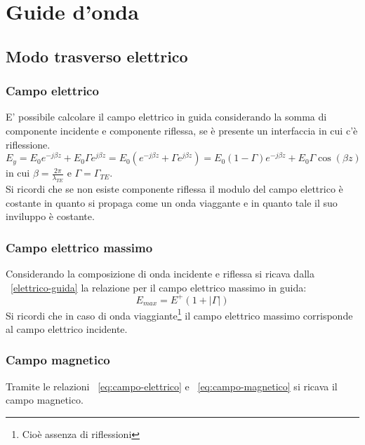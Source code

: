

\chapter{Guide d'onda}
		
	\section{Modo trasverso elettrico}

		\subsection{Campo elettrico}
		E' possibile calcolare il campo elettrico in guida considerando la somma di componente incidente e componente riflessa, se è presente un interfaccia in cui c'è riflessione.
				\begin{equation}
				E_y= E_0e^{-j\beta z}+E_0 \Gamma e^{j \beta z}=E_0(e^{-j \beta z}+\Gamma e^{j \beta z}) =E_0(1 - \Gamma)e^{-j \beta z} + E_0 \Gamma \cos(\beta z)
				\label{elettrico-guida}
				\end{equation}
				in cui $\beta=\frac{2 \pi }{\lambda_{TE}}$ e $\Gamma=\Gamma_{TE}$.
		\\

		Si ricordi che se non esiste componente riflessa il modulo del campo elettrico è costante in quanto si propaga come un onda viaggante e in quanto tale il suo inviluppo è costante.
	
		\subsection{Campo elettrico massimo}
		Considerando la composizione di onda incidente e riflessa si ricava dalla ~\ref{elettrico-guida} la relazione per il campo elettrico massimo in guida:
				\begin{equation}
				E_{max}=E^+(1+|\Gamma|)
				\label{elettrico-massimo}
				\end{equation}
		Si ricordi che in caso di onda viaggiante\footnote{Cioè assenza di riflessioni} il campo elettrico massimo corrisponde al campo elettrico incidente.

		\subsection{Campo magnetico}

		Tramite le relazioni ~\ref{eq:campo-elettrico} e ~\ref{eq:campo-magnetico} si ricava il campo magnetico.

